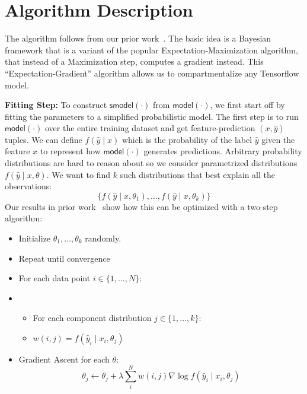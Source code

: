 \section{Algorithm Description}


The algorithm follows from our prior work~\cite{DBLP:journals/corr/KrishnanGLMPG16, Krishnan17}.  The basic idea is a Bayesian framework that is a variant of the popular Expectation-Maximization algorithm, that instead of a Maximization step, computes a gradient instead. This ``Expectation-Gradient'' algorithm allows us to compartmentalize any Tensorflow model.

\vspace{0.5em} \noindent \textbf{Fitting Step: } To construct $\textsf{smodel}(\cdot)$ from $\textsf{model}(\cdot)$, we first start off by fitting the parameters to a simplified probabilistic model. 
The first step is to run $\textsf{model}(\cdot)$ over the entire training dataset and get feature-prediction $(x, \hat{y})$ tuples.
We can define $f(\hat{y} \mid x)$ which is the probability of the label $\hat{y}$ given the feature $x$ to represent how $\textsf{model}(\cdot)$ generates predictions. 
Arbitrary probability distributions are hard to reason about so we consider parametrized distributions $f(\hat{y} \mid x, \theta)$. 
We want to find $k$ such distributions that best explain all the observations:
\[
\{f(\hat{y} \mid x, \theta_1),...,f(\hat{y} \mid x, \theta_k)\}
\]
Our results in prior work~\cite{?,Krishnan17} show how this can be optimized with a two-step algorithm:
\begin{itemize}
    \item Initialize $\theta_1,...,\theta_k$ randomly.
    \item Repeat until convergence
    \item For each data point $i \in \{1,...,N\}$: 
    \item \begin{itemize} 
          \item For each component distribution $j \in \{1,...,k\}$:
          \item $w(i,j) = f(\hat{y}_i \mid x_i, \theta_j)$
    \end{itemize}
    \item Gradient Ascent for each $\theta$:
    \[ \theta_j \leftarrow \theta_j + \lambda \sum_i^N w(i,j) \nabla \log f(\hat{y}_i \mid x_i, \theta_j)  \]
\end{itemize}

